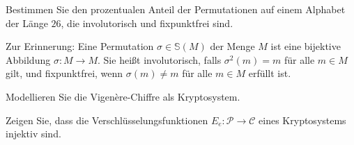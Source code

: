 \documentclass[german]{mhexsheet}
\begin{document}
\takehome

\begin{exercise}[title = Schwächen der Enigma]
 Bestimmen Sie den prozentualen Anteil der Permutationen auf einem Alphabet der Länge $26$, die involutorisch und fixpunktfrei sind. 
 
 Zur Erinnerung: Eine Permutation $\sigma \in \mathbb S(M)$ der Menge $M$ ist eine bijektive Abbildung $\sigma: M \rightarrow M$. Sie heißt involutorisch, falls $\sigma^2(m) = m$ für alle $m \in M$ gilt, und fixpunktfrei, wenn $\sigma(m) \neq m$ für alle $m \in M$ erfüllt ist.
\end{exercise}


\begin{exercise}[title = Vigenère-Chiffre]
 Modellieren Sie die Vigenère-Chiffre als Kryptosystem.
\end{exercise}

\begin{exercise}[title = Verschlüsselungsfunktionen]
 Zeigen Sie, dass die Verschlüsselungsfunktionen $E_e\colon \mathcal P \rightarrow \mathcal C$ eines Kryptosystems injektiv sind.
\end{exercise}
\end{document}
